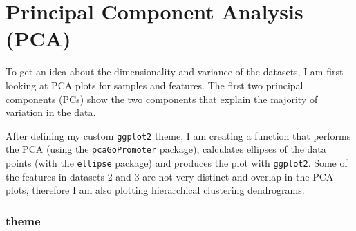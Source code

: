 \documentclass[]{book}
\newenvironment{Shaded}{\begin{snugshade}}{\end{snugshade}}
\newcommand{\CommentTok}[1]{\textcolor[rgb]{0.56,0.35,0.01}{\textit{#1}}}
\newcommand{\KeywordTok}[1]{\textcolor[rgb]{0.13,0.29,0.53}{\textbf{#1}}}
\newcommand{\NormalTok}[1]{#1}
\begin{document}
\begin{Shaded}
\end{Shaded}

\hypertarget{principal-component-analysis-pca}{%
\section{Principal Component Analysis (PCA)}\label{principal-component-analysis-pca}}

To get an idea about the dimensionality and variance of the datasets, I am first looking at PCA plots for samples and features. The first two principal components (PCs) show the two components that explain the majority of variation in the data.

After defining my custom \texttt{ggplot2} theme, I am creating a function that performs the PCA (using the \texttt{pcaGoPromoter} package), calculates ellipses of the data points (with the \texttt{ellipse} package) and produces the plot with \texttt{ggplot2}. Some of the features in datasets 2 and 3 are not very distinct and overlap in the PCA plots, therefore I am also plotting hierarchical clustering dendrograms.

\hypertarget{theme}{%
\subsubsection{theme}\label{theme}}
\end{document}
